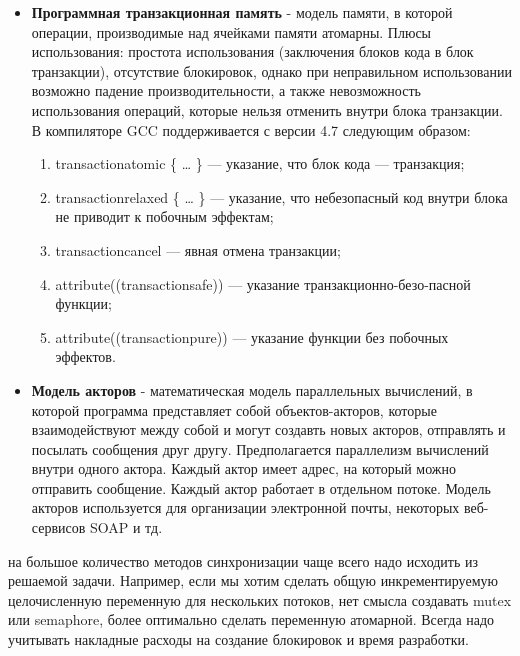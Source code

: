 {		\begin{itemize}
			\item\textbf{Программная транзакционная память} - модель памяти, в которой операции, производимые над ячейками памяти атомарны. Плюсы использования: простота использования (заключения блоков кода в блок транзакции), отсутствие блокировок, однако при неправильном использовании возможно падение производительности, а также невозможность использования операций, которые нельзя отменить внутри блока транзакции. В компиляторе GCC поддерживается с версии 4.7 следующим образом: 
				\begin{enumerate}
					\item\textunderscore \textunderscore transaction\textunderscore atomic \{ … \} — указание, что блок кода — транзакция;
					\item\textunderscore \textunderscore transaction\textunderscore relaxed \{ … \} — указание, что небезопасный код внутри блока не приводит к побочным эффектам;
					\item\textunderscore \textunderscore transaction\textunderscore cancel — явная отмена транзакции;
					\item attribute((transaction\textunderscore safe)) — указание транзакционно-безо-пасной функции;
					\item attribute((transaction\textunderscore pure)) — указание функции без побочных эффектов.
				\end{enumerate}
			\item\textbf{Модель акторов} - математическая модель параллельных вычислений, в которой программа представляет собой объектов-акторов, которые взаимодействуют между собой и могут создавть новых акторов, отправлять и посылать сообщения друг другу. Предполагается параллелизм вычислений внутри одного актора. Каждый актор имеет адрес, на который можно отправить сообщение. Каждый актор работает в отдельном потоке. Модель акторов используется для организации электронной почты, некоторых веб-сервисов SOAP и тд.
		\end{itemize}
	 на большое количество методов синхронизации чаще всего надо исходить из решаемой задачи. Например, если мы хотим сделать общую инкрементируемую целочисленную переменную для нескольких потоков, нет смысла создавать mutex или semaphore, более оптимально сделать переменную атомарной. Всегда надо учитывать накладные расходы на создание блокировок и время разработки.
}